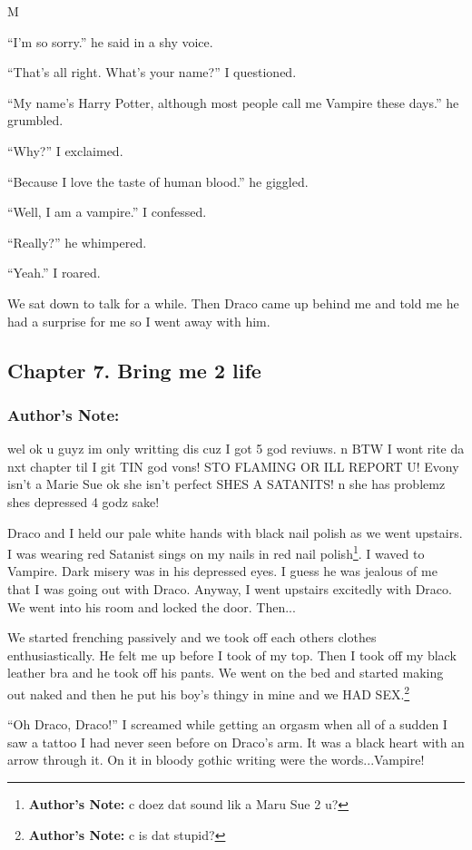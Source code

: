 M\documentclass{article}
\begin{document}
“I’m so sorry.” he said in a shy voice.

“That’s all right. What’s your name?” I questioned.

“My name’s Harry Potter, although most people call me Vampire these days.” he grumbled.

“Why?” I exclaimed.

“Because I love the taste of human blood.” he giggled.

“Well, I am a vampire.” I confessed.

“Really?” he whimpered.

“Yeah.” I roared.

We sat down to talk for a while. Then Draco came up behind me and told me he had a surprise for me so I went away with him.

\clearpage\nolinenumbers
\subsection*{Chapter 7. Bring me 2 life}

\subsubsection*{Author's Note: }wel ok u guyz im only writting dis cuz I got 5 god reviuws. n BTW I wont rite da nxt chapter til I git TIN god vons! STO FLAMING OR ILL REPORT U! Evony isn’t a Marie Sue ok she isn’t perfect SHES A SATANITS! n she has problemz shes depressed 4 godz sake!

\textbreak
\linenumbers\resetlinenumber

Draco and I held our pale white hands with black nail polish as we went upstairs. I was wearing red Satanist sings on my nails in red nail polish\footnote{\textbf{Author's Note: }c doez dat sound lik a Maru Sue 2 u?}. I waved to Vampire. Dark misery was in his depressed eyes. I guess he was jealous of me that I was going out with Draco. Anyway, I went upstairs excitedly with Draco. We went into his room and locked the door. Then...

We started frenching passively and we took off each others clothes enthusiastically. He felt me up before I took of my top. Then I took off my black leather bra and he took off his pants. We went on the bed and started making out naked and then he put his boy’s thingy in mine and we HAD SEX.\footnote{\textbf{Author's Note: }c is dat stupid?}

“Oh Draco, Draco!” I screamed while getting an orgasm when all of a sudden I saw a tattoo I had never seen before on Draco’s arm. It was a black heart with an arrow through it. On it in bloody gothic writing were the words...Vampire!
\end{document}
